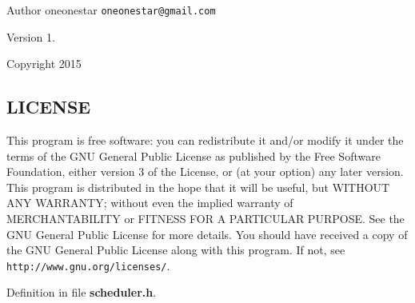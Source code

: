 \begin{DoxyAuthor}{Author}
oneonestar {\tt oneonestar@gmail.\+com} 
\end{DoxyAuthor}
\begin{DoxyVersion}{Version}
1. 
\end{DoxyVersion}
\begin{DoxyCopyright}{Copyright}
2015
\end{DoxyCopyright}
\subsection{L\+I\+C\+E\+N\+S\+E}\label{user_8h_LICENSE}
This program is free software\+: you can redistribute it and/or modify it under the terms of the G\+N\+U General Public License as published by the Free Software Foundation, either version 3 of the License, or (at your option) any later version. This program is distributed in the hope that it will be useful, but W\+I\+T\+H\+O\+U\+T A\+N\+Y W\+A\+R\+R\+A\+N\+T\+Y; without even the implied warranty of M\+E\+R\+C\+H\+A\+N\+T\+A\+B\+I\+L\+I\+T\+Y or F\+I\+T\+N\+E\+S\+S F\+O\+R A P\+A\+R\+T\+I\+C\+U\+L\+A\+R P\+U\+R\+P\+O\+S\+E. See the G\+N\+U General Public License for more details. You should have received a copy of the G\+N\+U General Public License along with this program. If not, see {\tt http\+://www.\+gnu.\+org/licenses/}. 

Definition in file {\bf scheduler.\+h}.

